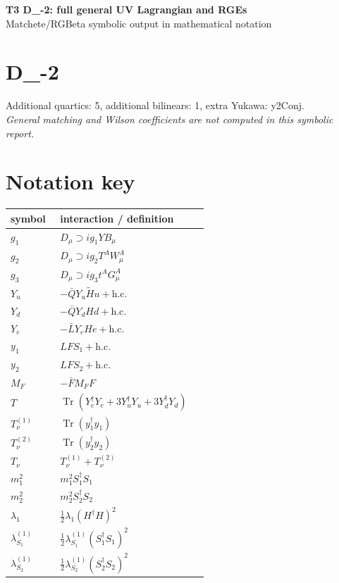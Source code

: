 \documentclass[10pt,a4paper]{article}
\begin{document}
\begin{center}
{\Large\bfseries T3 D\_-2: full general UV Lagrangian and RGEs}\\[4pt]
Matchete/RGBeta symbolic output in mathematical notation
\end{center}
\bigskip
\section*{D\_-2}
Additional quartics: 5, additional bilinears: 1, extra Yukawa: y2Conj.\\
\emph{General matching and Wilson coefficients are not computed in this symbolic report.}
\section*{Notation key}
\begin{longtable}{@{}p{0.23\linewidth}p{0.69\linewidth}@{}}
\toprule
symbol & interaction / definition \\
\midrule
$g_1$ & $D_\mu\supset i g_1YB_\mu$ \\
$g_2$ & $D_\mu\supset i g_2T^AW_\mu^A$ \\
$g_3$ & $D_\mu\supset i g_3t^AG_\mu^A$ \\
$Y_u$ & $-\bar QY_u\widetilde Hu+\mathrm{h.c.}$ \\
$Y_d$ & $-\bar QY_dHd+\mathrm{h.c.}$ \\
$Y_e$ & $-\bar LY_eHe+\mathrm{h.c.}$ \\
$y_1$ & $LFS_1+\mathrm{h.c.}$ \\
$y_2$ & $LFS_2+\mathrm{h.c.}$ \\
$M_F$ & $-\bar FM_FF$ \\
$T$ & $\operatorname{Tr}(Y_e^\dagger Y_e+3Y_u^\dagger Y_u+3Y_d^\dagger Y_d)$ \\
$T_\nu^{(1)}$ & $\operatorname{Tr}(y_1^\dagger y_1)$ \\
$T_\nu^{(2)}$ & $\operatorname{Tr}(y_2^\dagger y_2)$ \\
$T_\nu$ & $T_\nu^{(1)}+T_\nu^{(2)}$ \\
$m_1^2$ & $m_1^2S_1^\dagger S_1$ \\
$m_2^2$ & $m_2^2S_2^\dagger S_2$ \\
$\lambda_1$ & $\frac12\lambda_1(H^\dagger H)^2$ \\
$\lambda_{S_1}^{(1)}$ & $\frac12\lambda_{S_1}^{(1)}(S_1^\dagger S_1)^2$ \\
$\lambda_{S_2}^{(1)}$ & $\frac12\lambda_{S_2}^{(1)}(S_2^\dagger S_2)^2$ \\

\end{longtable}
\end{document}
